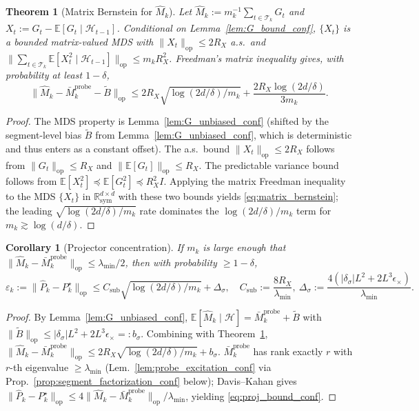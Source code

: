 \documentclass{article}
\newcommand{\R}{\mathbb{R}}
\newcommand{\E}{\mathbb{E}}
\newcommand{\op}{\mathrm{op}}
\newcommand{\cH}{\mathcal{H}}
\newcommand{\cT}{\mathcal{T}}
\newtheorem{theorem}{Theorem}
\newtheorem{corollary}{Corollary}
\begin{document}
\begin{theorem}[Matrix Bernstein for $\widehat M_k$]
\label{thm:matrix_bernstein_conf}
Let $\widehat M_k := m_k^{-1}\sum_{t\in\cT_k} G_t$ and
$X_t := G_t - \E[G_t\mid\cH_{t-1}]$. Conditional on
Lemma~\ref{lem:G_bound_conf}, $\{X_t\}$ is a bounded matrix-valued
MDS with $\|X_t\|_\op\le 2R_X$ a.s.\ and
$\|\sum_{t\in\cT_k}\E[X_t^2\mid\cH_{t-1}]\|_\op\le m_k R_X^2$.
Freedman's matrix inequality \citep{tropp2011freedman} gives, with
probability at least $1-\delta$,
\begin{equation}
\|\widehat M_k - \bar M_k^{\mathrm{probe}} - \widetilde B\|_\op
\le 2R_X\sqrt{\log(2d/\delta)/m_k} + \frac{2R_X\log(2d/\delta)}{3m_k}.
\label{eq:matrix_bernstein}
\end{equation}
\end{theorem}
\begin{proof}
The MDS property is Lemma~\ref{lem:G_unbiased_conf} (shifted by the
segment-level bias $\widetilde B$ from
Lemma~\ref{lem:G_unbiased_conf}, which is deterministic and thus enters
as a constant offset). The a.s.\ bound $\|X_t\|_\op\le 2R_X$ follows
from $\|G_t\|_\op\le R_X$ and $\|\E[G_t]\|_\op\le R_X$. The predictable
variance bound follows from $\E[X_t^2]\preceq \E[G_t^2]\preceq R_X^2 I$.
Applying the matrix Freedman inequality to the MDS $\{X_t\}$ in
$\R^{d\times d}_{\mathrm{sym}}$ with these two bounds yields
\eqref{eq:matrix_bernstein}; the leading $\sqrt{\log(2d/\delta)/m_k}$
rate dominates the $\log(2d/\delta)/m_k$ term for $m_k\gtrsim\log(d/\delta)$.
\end{proof}

\begin{corollary}[Projector concentration]
\label{cor:projector_conf}
If $m_k$ is large enough that
$\|\widehat M_k - \bar M_k^{\mathrm{probe}}\|_\op \le \lambda_{\min}/2$,
then with probability $\ge 1-\delta$,
\begin{equation}
\varepsilon_k := \|\widehat P_k - P_k^\star\|_\op
\le C_{\mathrm{sub}}\sqrt{\log(2d/\delta)/m_k}
+ \Delta_\sigma,\quad
C_{\mathrm{sub}} := \frac{8 R_X}{\lambda_{\min}},\
\Delta_\sigma := \frac{4(|\delta_\sigma|L^2 + 2L^3\epsilon_\times)}{\lambda_{\min}}.
\label{eq:proj_bound_conf}
\end{equation}
\end{corollary}
\begin{proof}
By Lemma~\ref{lem:G_unbiased_conf}, $\E[\widehat M_k\mid\cH]
= \bar M_k^{\mathrm{probe}} + \widetilde B$ with
$\|\widetilde B\|_\op \le |\delta_\sigma|L^2 + 2L^3\epsilon_\times =: b_\sigma$.
Combining with Theorem~\ref{thm:matrix_bernstein_conf},
$\|\widehat M_k - \bar M_k^{\mathrm{probe}}\|_\op
\le 2R_X\sqrt{\log(2d/\delta)/m_k} + b_\sigma$.
$\bar M_k^{\mathrm{probe}}$ has rank exactly $r$ with $r$-th
eigenvalue $\ge\lambda_{\min}$ (Lem.~\ref{lem:probe_excitation_conf}
via Prop.~\ref{prop:segment_factorization_conf} below); Davis--Kahan
\citep[Thm.~VII.3.1]{bhatia1997matrix} gives
$\|\widehat P_k - P_k^\star\|_\op\le 4\|\widehat M_k - \bar M_k^{\mathrm{probe}}\|_\op / \lambda_{\min}$,
yielding \eqref{eq:proj_bound_conf}.
\end{proof}
\end{document}
